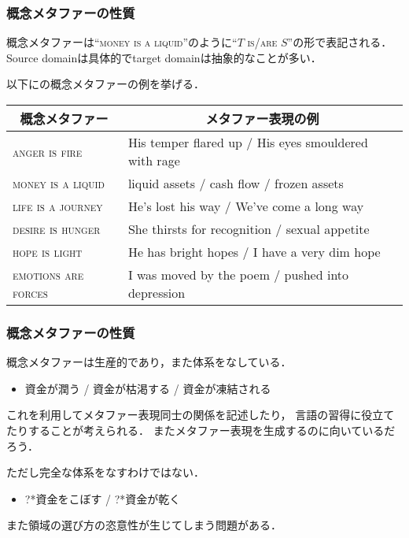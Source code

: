\documentclass[11pt]{beamer}
\newlength{\la}
\let\oldcite=\citet
\renewcommand\citet[1]{\hyperlink{#1}{\oldcite{#1}}}
\newcommand\thc[1]{\multicolumn{1}{c}{\textbf{#1}}}
\begin{document}
\begin{frame}
\frametitle{概念メタファーの性質}
概念メタファーは“\textsc{money is a liquid}”のように“$T$ \textsc{is/are} $S$”の形で表記される．
Source domainは具体的でtarget domainは抽象的なことが多い．

\bigskip

以下に\citet{mastermetaphorlist}の概念メタファーの例を挙げる．

\begingroup
\scriptsize
\begin{table}
\centering
    \begin{tabular}{ll}
        \toprule
        \thc{概念メタファー} & \thc{メタファー表現の例} \\
        \midrule
        \textsc{anger is fire}        & His temper flared up / His eyes smouldered with rage \\
        \textsc{money is a liquid}    & liquid assets / cash flow / frozen assets \\
        \textsc{life is a journey}    & He’s lost his way / We’ve come a long way \\
        \textsc{desire is hunger}     & She thirsts for recognition / sexual appetite \\
        \textsc{hope is light}        & He has bright hopes / I have a very dim hope \\
        \textsc{emotions are forces}  & I was moved by the poem / pushed into depression \\
        \bottomrule
    \end{tabular}
\end{table}
\endgroup

\end{frame}

\begin{frame}
\frametitle{概念メタファーの性質}
概念メタファーは生産的であり，また体系をなしている．
\begin{itemize}
    \item 資金が潤う / 資金が枯渇する / 資金が凍結される
\end{itemize}
これを利用してメタファー表現同士の関係を記述したり，
言語の習得に役立てたりすることが考えられる．
またメタファー表現を生成するのに向いているだろう．

\bigskip

ただし完全な体系をなすわけではない．
\begin{itemize}
    \item ?*資金をこぼす / ?*資金が乾く
\end{itemize}

また領域の選び方の恣意性が生じてしまう問題がある．
\end{frame}
\end{document}
